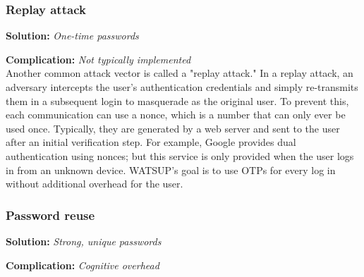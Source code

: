 \subsubsection{Replay attack}

\textbf{Solution:} \emph{One-time passwords}

\noindent\textbf{Complication:} \emph{Not typically implemented}\\

Another common attack vector is called a "replay attack." In a replay attack, an adversary intercepts the user's authentication credentials and simply re-transmits them in a subsequent login to masquerade as the original user. To prevent this, each communication can use a nonce, which is a number that can only ever be used once. Typically, they are generated by a web server and sent to the user after an initial verification step. For example, Google provides dual authentication using nonces; but this service is only provided when the user logs in from an unknown device. WATSUP’s goal is to use OTPs for every log in without additional overhead for the user.


\subsubsection{Password reuse}

\textbf{Solution:} \emph{Strong, unique passwords}

\noindent\textbf{Complication:} \emph{Cognitive overhead}\\

